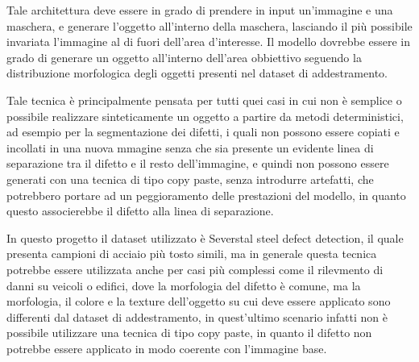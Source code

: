 Tale architettura deve essere in grado di prendere in input un'immagine e una maschera, e generare l'oggetto all'interno della maschera, 
lasciando il più possibile invariata l'immagine al di fuori dell'area d'interesse.
Il modello dovrebbe essere in grado di generare un oggetto all'interno dell'area obbiettivo seguendo la distribuzione morfologica degli oggetti 
presenti nel dataset di addestramento.

Tale tecnica è principalmente pensata per tutti quei casi in cui non è semplice o possibile realizzare sinteticamente un oggetto a partire da metodi deterministici, 
ad esempio per la segmentazione dei difetti, i quali non possono essere copiati e incollati in una nuova mmagine senza che sia presente un evidente linea di separazione
tra il difetto e il resto dell'immagine, e quindi non possono essere generati con una tecnica di tipo copy paste, senza introdurre artefatti, che potrebbero 
portare ad un peggioramento delle prestazioni del modello, in quanto questo associerebbe il difetto alla linea di separazione.

In questo progetto il dataset utilizzato è Severstal steel defect detection, il quale presenta campioni di acciaio più tosto simili,
ma in generale questa tecnica potrebbe essere utilizzata anche per casi più complessi come il rilevmento di danni su veicoli o edifici,
dove la morfologia del difetto è comune, ma la morfologia, il colore e la texture dell'oggetto su cui deve essere applicato sono differenti 
dal dataset di addestramento, in quest'ultimo scenario infatti non è possibile utilizzare una tecnica di tipo copy paste, in quanto il difetto 
non potrebbe essere applicato in modo coerente con l'immagine base.